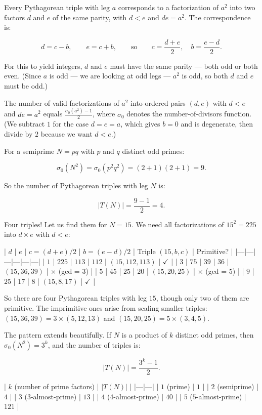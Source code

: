 \documentclass[11pt,twoside,openright]{book}
\theoremstyle{definition}
\theoremstyle{remark}
\begin{document}
Every Pythagorean triple with leg $a$ corresponds to a factorization of $a^2$ into two factors $d$ and $e$ of the same parity, with $d < e$ and $de = a^2$. The correspondence is:

\[d = c - b, \qquad e = c + b, \qquad \text{so} \qquad c = \frac{d + e}{2}, \quad b = \frac{e - d}{2}.\]

For this to yield integers, $d$ and $e$ must have the same parity --- both odd or both even. (Since $a$ is odd --- we are looking at odd legs --- $a^2$ is odd, so both $d$ and $e$ must be odd.)

The number of valid factorizations of $a^2$ into ordered pairs $(d, e)$ with $d < e$ and $de = a^2$ equals $\frac{\sigma_0(a^2) - 1}{2}$, where $\sigma_0$ denotes the number-of-divisors function. (We subtract $1$ for the case $d = e = a$, which gives $b = 0$ and is degenerate, then divide by $2$ because we want $d < e$.)

For a semiprime $N = pq$ with $p$ and $q$ distinct odd primes:

\[\sigma_0(N^2) = \sigma_0(p^2 q^2) = (2 + 1)(2 + 1) = 9.\]

So the number of Pythagorean triples with leg $N$ is:

\[|T(N)| = \frac{9 - 1}{2} = 4.\]

Four triples! Let us find them for $N = 15$. We need all factorizations of $15^2 = 225$ into $d \times e$ with $d < e$:

| $d$ | $e$ | $c = (d+e)/2$ | $b = (e-d)/2$ | Triple $(15, b, c)$ | Primitive? |
|---|---|---|---|---|---|
| $1$ | $225$ | $113$ | $112$ | $(15, 112, 113)$ | $\checkmark$ |
| $3$ | $75$ | $39$ | $36$ | $(15, 36, 39)$ | $\times$ (gcd = 3) |
| $5$ | $45$ | $25$ | $20$ | $(15, 20, 25)$ | $\times$ (gcd = 5) |
| $9$ | $25$ | $17$ | $8$ | $(15, 8, 17)$ | $\checkmark$ |

So there are four Pythagorean triples with leg $15$, though only two of them are primitive. The imprimitive ones arise from scaling smaller triples: $(15, 36, 39) = 3 \times (5, 12, 13)$ and $(15, 20, 25) = 5 \times (3, 4, 5)$.


The pattern extends beautifully. If $N$ is a product of $k$ distinct odd primes, then $\sigma_0(N^2) = 3^k$, and the number of triples is:

\[|T(N)| = \frac{3^k - 1}{2}.\]

| $k$ (number of prime factors) | $|T(N)|$ |
|---|---|
| $1$ (prime) | $1$ |
| $2$ (semiprime) | $4$ |
| $3$ ($3$-almost-prime) | $13$ |
| $4$ ($4$-almost-prime) | $40$ |
| $5$ ($5$-almost-prime) | $121$ |
\end{document}
